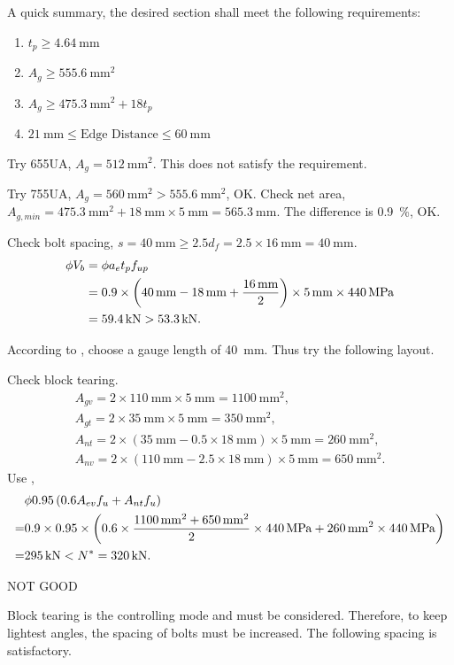 \begin{solution}
A quick summary, the desired section shall meet the following requirements:
\begin{enumerate}
\item $t_p\geqslant\SI{4.64}{\mm}$
\item $A_g\geqslant\SI{555.6}{\mm^2}$
\item $A_g\geqslant\SI{475.3}{\mm^2}+18t_p$
\item $\SI{21}{\mm}\leqslant\text{Edge Distance}\leqslant\SI{60}{\mm}$
\end{enumerate}

Try 65\texttimes5UA, $A_g=\SI{512}{\mm^2}$. This does not satisfy the requirement.

Try 75\texttimes5UA, $A_g=\SI{560}{\mm^2}>\SI{555.6}{\mm^2}$, OK. Check net area,
$A_{g,min}=\SI{475.3}{\mm^2}+\SI{18}{\mm}\times\SI{5}{\mm}=\SI{565.3}{\mm}$. The difference is \SI{0.9}{\percent}, OK.

Check bolt spacing, $s=\SI{40}{\mm}\geqslant2.5d_f=2.5\times\SI{16}{\mm}=\SI{40}{\mm}$.
\begin{align*}
\phi{}V_b&=\phi{}a_et_pf_{up}\\&=0.9\times\left(\SI{40}{\milli\meter}-\SI{18}{\milli\meter}+\dfrac{\SI{16}{\milli\meter}}{2}\right)\times\SI{5}{\milli\meter}\times\SI{440}{\mega\pascal}\\&=\SI{59.4}{\kilo\newton}>\SI{53.3}{\kilo\newton}.
\end{align*}

According to , choose a gauge length of \SI{40}{\mm}. Thus try the following layout.
\begin{figure}[H]

\end{figure}
Check block tearing.
\begin{gather*}
A_{gv}=2\times\SI{110}{\mm}\times\SI{5}{\mm}=\SI{1100}{\mm^2},\\
A_{gt}=2\times\SI{35}{\mm}\times\SI{5}{\mm}=\SI{350}{\mm^2},\\
A_{nt}=2\times\left(\SI{35}{\mm}-0.5\times\SI{18}{\mm}\right)\times\SI{5}{\mm}=\SI{260}{\mm^2},\\
A_{nv}=2\times\left(\SI{110}{\mm}-2.5\times\SI{18}{\mm}\right)\times\SI{5}{\mm}=\SI{650}{\mm^2}.
\end{gather*}
Use ,
\begin{align*}
&\phi0.95\left(0.6A_{ev}f_u+A_{nt}f_u\right)\\
=&0.9\times0.95\times\left(0.6\times\dfrac{\SI{1100}{\milli\meter^2}+\SI{650}{\milli\meter^2}}{2}\times\SI{440}{\mega\pascal}+\SI{260}{\milli\meter^2}\times\SI{440}{\mega\pascal}\right)\\
=&\SI{295}{\kilo\newton}<N^*=\SI{320}{\kilo\newton}.
\end{align*}
\begin{flushright}
NOT GOOD
\end{flushright}
Block tearing is the controlling mode and must be considered. Therefore, to keep lightest angles, the spacing of bolts must be increased. The following spacing is satisfactory.
\begin{figure}[H]

\end{figure}
\end{solution}
